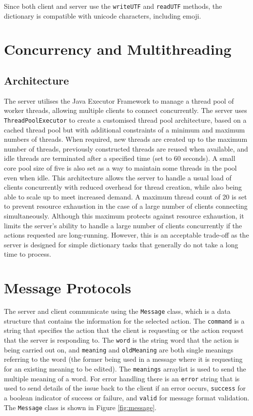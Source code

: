 \documentclass{article}
\begin{document}
Since both client and server use the \texttt{writeUTF} and \texttt{readUTF} methods, the dictionary is compatible with unicode characters, including emoji.

\section*{Concurrency and Multithreading}

\subsection*{Architecture}
The server utilises the Java Executor Framework \cite{oracle-concurrent-docs} to manage a thread pool of worker threads, allowing multiple clients to connect concurrently. The server uses \texttt{ThreadPoolExecutor} to create a customised thread pool architecture, based on a cached thread pool \cite{geeksforgeeks-thread-pools-java} but with additional constraints of a minimum and maximum numbers of threads. When required, new threads are created up to the maximum number of threads, previously constructed threads are reused when available, and idle threads are terminated after a specified time (set to 60 seconds). A small core pool size of five is also set as a way to maintain some threads in the pool even when idle. This architecture allows the server to handle a usual load of clients concurrently with reduced overhead for thread creation, while also being able to scale up to meet increased demand. A maximum thread count of 20 is set to prevent resource exhaustion in the case of a large number of clients connecting simultaneously. Although this maximum protects against resource exhaustion, it limits the server's ability to handle a large number of clients concurrently if the actions requested are long-running. However, this is an acceptable trade-off as the server is designed for simple dictionary tasks that generally do not take a long time to process.


\section*{Message Protocols}
The server and client communicate using the \texttt{Message} class, which is a data structure that contains the information for the selected action. The \texttt{command} is a string that specifies the action that the client is requesting or the action request that the server is responding to. The \texttt{word} is the string word that the action is being carried out on, and \texttt{meaning} and \texttt{oldMeaning} are both single meanings referring to the word (the former being used in a message where it is requesting for an existing meaning to be edited). The \texttt{meanings} arraylist is used to send the multiple meaning of a word. For error handling there is an \texttt{error} string that is used to send details of the issue back to the client if an error occurs, \texttt{success} for a boolean indicator of success or failure, and \texttt{valid} for message format validation. The \texttt{Message} class is shown in Figure \ref{fig:message}.
\end{document}
